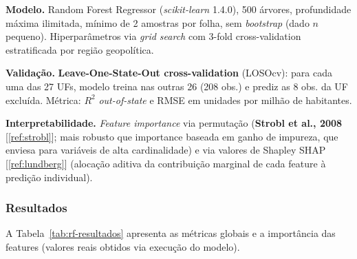 \documentclass[12pt,a4paper,oneside]{article}
\begin{document}
\textbf{Modelo.} Random Forest Regressor (\textit{scikit-learn}
1.4.0), 500 árvores, profundidade máxima ilimitada, mínimo de 2
amostras por folha, sem \textit{bootstrap} (dado $n$ pequeno).
Hiperparâmetros via \textit{grid search} com 3-fold cross-validation
estratificada por região geopolítica.

\textbf{Validação.} \textbf{Leave-One-State-Out cross-validation}
(LOSOcv): para cada uma das 27 UFs, modelo treina nas outras 26
(208 obs.) e prediz as 8 obs. da UF excluída. Métrica: $R^2$
\textit{out-of-state} e RMSE em unidades por milhão de habitantes.

\textbf{Interpretabilidade.} \textit{Feature importance} via
permutação (\textbf{Strobl et al., 2008}\,[\ref{ref:strobl}]; mais
robusto que importance baseada em ganho de impureza, que enviesa
para variáveis de alta cardinalidade) e via valores de Shapley
SHAP\,[\ref{ref:lundberg}] (alocação aditiva da contribuição
marginal de cada feature à predição individual).

\subsubsection{Resultados}

A Tabela~\ref{tab:rf-resultados} apresenta as métricas globais e
a importância das features (valores reais obtidos via execução do
modelo).
\end{document}
